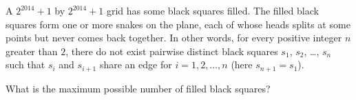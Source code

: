 A $2^{2014} + 1$ by $2^{2014} + 1$ grid has some black squares filled. The filled black squares form one or more snakes on the plane, each of whose heads splits at some points but never comes back together. In other words, for every positive integer $n$ greater than $2$, there do not exist pairwise distinct black squares $s_1$, $s_2$, \dots, $s_n$ such that $s_i$ and $s_{i+1}$ share an edge for $i=1,2, \dots, n$ (here $s_{n+1}=s_1$).

What is the maximum possible number of filled black squares?

